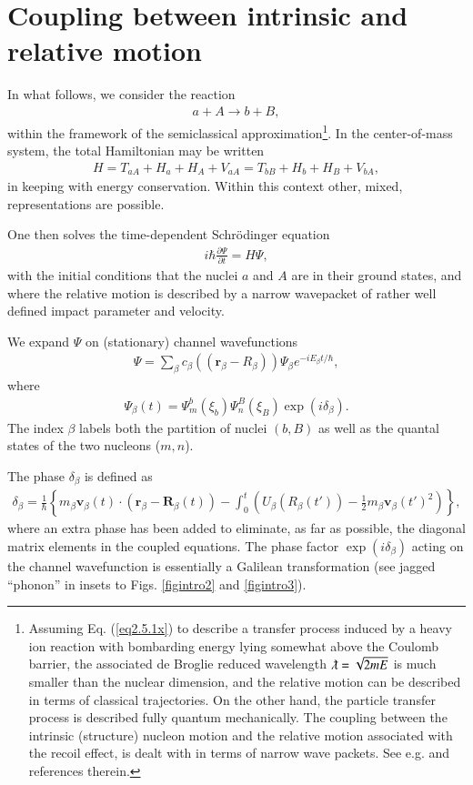 \section{Coupling between intrinsic and relative motion}\label{appintroB}
In what follows, we consider the reaction
\begin{align}\label{eq2.5.1x}
a+A\rightarrow b+B,
\end{align}
within the framework of the semiclassical approximation\footnote{Assuming Eq. (\ref{eq2.5.1x}) to describe a transfer process induced by a heavy ion reaction with bombarding energy lying somewhat above the Coulomb barrier, the associated de Broglie reduced wavelength $\lambdabar=\sqrt{2mE}$ is much smaller than the nuclear dimension, and the relative motion can be described in terms of classical trajectories. On the other hand, the particle transfer process is described fully quantum mechanically. The coupling between the intrinsic (structure) nucleon motion and the relative motion associated with the recoil effect, is dealt with in terms of narrow wave packets. See e.g. \cite{Broglia:04a} and references therein.}.
In the center-of-mass system, the total Hamiltonian may be written
\begin{align}\label{eqintroB2}
H=T_{aA}+H_a+H_A+V_{aA}=T_{bB}+H_b+H_B+V_{bA},
\end{align}
in keeping with energy conservation. Within this context other, mixed, representations are possible.

One then solves the time-dependent Schr\"odinger equation 
\begin{align}
i\hbar\frac{\partial \Psi}{\partial t}=H\Psi,
\end{align}
with the initial conditions that the nuclei $a$ and $A$ are in their ground states, and where the relative motion is described by a narrow wavepacket of rather well defined impact parameter and velocity.


We expand $\Psi$ on (stationary) channel wavefunctions 
\begin{align}
\Psi=\sum_{\beta}c_\beta\left(\left(\mathbf r_\beta-R_\beta\right)\right)\Psi_\beta e^{-iE_\beta t/\hbar},
\end{align}
where
\begin{align}
\Psi_\beta (t)=\Psi_m^b(\xi_b)\Psi_n^B(\xi_B)\exp(i\delta_\beta).
\end{align}
The index $\beta$ labels both the partition of nuclei $(b,B)$ as well as the quantal states of the two nucleons ($m,n$).


The phase $\delta_\beta$ is defined as
\begin{align}
\delta_\beta=\frac{1}{\hbar}\left\{m_\beta \mathbf v_\beta(t)\cdot \left(\mathbf r_\beta-\mathbf R_\beta(t)\right)-\int_0^t\left(U_\beta\left(R_\beta(t')\right)-\frac{1}{2}m_\beta\mathbf v_\beta(t')^2\right)\right\},
\end{align}
 where an extra phase has been added to eliminate, as far as possible, the diagonal matrix elements in the coupled equations.
The phase factor $\exp(i\delta_\beta)$ acting on the channel wavefunction is essentially a Galilean transformation (see jagged ``phonon'' in insets to Figs.  \ref{figintro2} and \ref{figintro3}).



